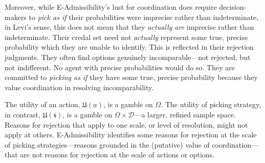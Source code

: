 \documentclass[a4paper]{article}
\newcommand\U{\mathfrak{U}} %
\newcommand{\D}{\mathcal{D}}
\newcommand\s{\mathsf{s}}
\renewcommand{\color}[1]{}
\newenvironment{CCM rewritten}
{\begingroup\color{blue}} %
{\endgroup}              %
\begin{document}

Moreover, while E-Admissibility's lust for coordination does require decision-makers to \emph{pick as if} their probabilities were imprecise rather than indeterminate, in Levi's sense, this does not mean that they \emph{actually are} imprecise rather than indeterminate. Their credal set need not \emph{actually} represent some true, precise probability which they are unable to identify. This is reflected in their rejection judgments. They often find options genuinely incomparable---not rejected, but not indifferent. No agent with precise probabilities would do so. They are committed to \emph{picking as if} they have some true, precise probability because they value coordination in resolving incomparability.

The utility of an action, $\U(a)$, is a gamble on $\Omega$. The utility of picking strategy, in contrast, $\U(\s)$, is a gamble on $\Omega\times\D$---a larger, refined sample space. Reasons for rejection that apply to one scale, or level of resolution, might not apply at others. E-Admissibility identifies some reasons for rejection at the scale of picking strategies---reasons grounded in the (putative) value of coordination---that are not reasons for rejection at the scale of actions or options. 


\end{document}
